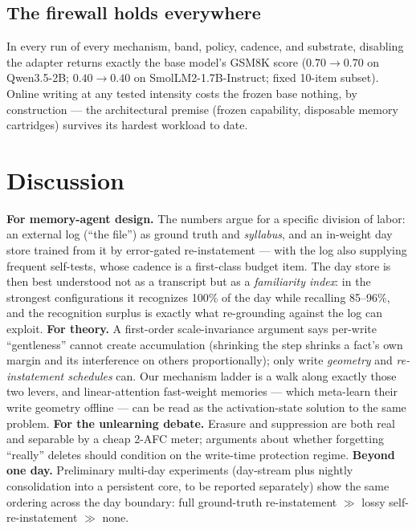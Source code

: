 \documentclass[11pt]{article}
\newcommand{\qwen}{Qwen3.5-2B}
\newcommand{\smol}{SmolLM2-1.7B-Instruct}
\begin{document}
\subsection{The firewall holds everywhere}

In every run of every mechanism, band, policy, cadence, and substrate, disabling the adapter returns
exactly the base model's GSM8K score ($0.70 \to 0.70$ on \qwen{}; $0.40 \to 0.40$ on \smol{}; fixed
10-item subset). Online writing at any tested intensity costs the frozen base nothing, by construction
--- the architectural premise (frozen capability, disposable memory cartridges) survives its hardest
workload to date.

\section{Discussion}\label{sec:discussion}

\textbf{For memory-agent design.} The numbers argue for a specific division of labor: an external log
(``the file'') as ground truth and \emph{syllabus}, and an in-weight day store trained from it by
error-gated re-instatement --- with the log also supplying frequent self-tests, whose cadence is a
first-class budget item. The day store is then best understood not as a transcript but as a
\emph{familiarity index}: in the strongest configurations it recognizes 100\% of the day while
recalling 85--96\%, and the recognition surplus is exactly what re-grounding against the log can
exploit. \textbf{For theory.} A first-order scale-invariance argument says per-write ``gentleness''
cannot create accumulation (shrinking the step shrinks a fact's own margin and its interference on
others proportionally); only write \emph{geometry} and \emph{re-instatement schedules} can. Our
mechanism ladder is a walk along exactly those two levers, and linear-attention fast-weight memories
--- which meta-learn their write geometry offline \citep{ahn2025} --- can be read as the
activation-state solution to the same problem. \textbf{For the unlearning debate.} Erasure and
suppression are both real and separable by a cheap 2-AFC meter; arguments about whether forgetting
``really'' deletes should condition on the write-time protection regime. \textbf{Beyond one day.}
Preliminary multi-day experiments (day-stream plus nightly consolidation into a persistent core, to
be reported separately) show the same ordering across the day boundary: full ground-truth
re-instatement $\gg$ lossy self-re-instatement $\gg$ none.
\end{document}
